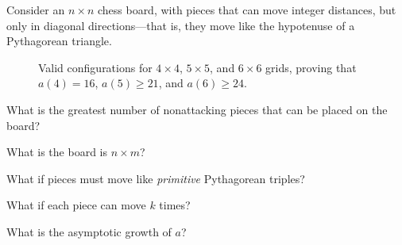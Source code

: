 \documentclass{article}
\begin{document}
  Consider an $n \times n$ chess board, with pieces that can move integer
  distances, but only in diagonal directions---that is, they move like the
  hypotenuse of a Pythagorean triangle.
\begin{figure}[!h]
  \centering
   \hspace{1cm}
   \hspace{1cm}
   \hspace{1cm}
  \caption{
    Valid configurations for $4 \times 4$, $5 \times 5$, and $6 \times 6$ grids,
    proving that $a(4) = 16$, $a(5) \geq 21$, and $a(6) \geq 24$.}
\end{figure}

\begin{question}
  What is the greatest number of nonattacking pieces that can be placed on the board?
\end{question}

\begin{related}
  \item What is the board is $n \times m$?
  \item What if pieces must move like \textit{primitive} Pythagorean triples?
  \item What if each piece can move $k$ times?
  \item What is the asymptotic growth of $a$?
\end{related}
\end{document}

